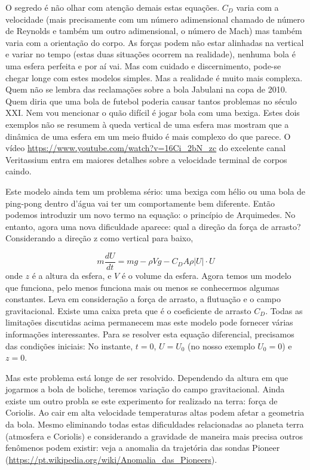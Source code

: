 O segredo é não olhar com atenção demais estas equações. $C_D$ varia com a velocidade (mais precisamente com um número adimensional chamado de número de Reynolds e também um outro adimensional, o número de Mach) mas também varia com a orientação do corpo. As forças podem não estar alinhadas na vertical e variar no tempo (estas duas situações ocorrem na realidade), nenhuma bola é uma esfera perfeita  e por aí vai. Mas com cuidado e discernimento, pode-se chegar longe com estes modelos simples. Mas a realidade é muito mais complexa. Quem não se lembra das reclamações sobre a bola Jabulani na copa de 2010. Quem diria que uma bola de futebol poderia causar tantos problemas no século XXI. Nem vou mencionar o quão difícil é jogar bola com uma bexiga. Estes dois exemplos não se resumem à queda vertical de uma esfera mas mostram que a dinâmica de uma esfera em um meio fluido é mais complexo do que parece. O vídeo \url{https://www.youtube.com/watch?v=16Ci_2bN_zc} do excelente canal Veritassium entra em maiores detalhes sobre a velocidade terminal de corpos caindo.

Este modelo ainda tem um problema sério: uma bexiga com hélio ou uma bola de ping-pong dentro d'água vai ter um comportamente bem diferente. Então podemos introduzir um novo termo na equação: o princípio de Arquimedes. No entanto, agora uma nova dificuldade aparece: qual a direção da força de arrasto? Considerando a direção z como vertical para baixo,

\[
m \frac{dU}{dt} = mg -\rho V g - C_D A \rho |U|\cdot U 
\]
onde $z$ é a altura da esfera, e $V$ é o volume da esfera. Agora temos um modelo que funciona, pelo menos funciona mais ou menos se conhecermos algumas constantes. Leva em consideração a força de arrasto, a flutuação e o campo gravitacional. Existe uma caixa preta que é o coeficiente de arrasto $C_D$. Todas as limitações discutidas acima permanecem mas este modelo pode fornecer várias informações interessantes. Para se resolver esta equação diferencial, precisamos das condições iniciais: No instante, $t=0$, $U=U_0$ (no nosso exemplo $U_0 = 0$) e $z=0$.


Mas este problema está longe de ser resolvido. Dependendo da altura em que jogarmos a bola de boliche, teremos variação do campo gravitacional. Ainda existe um outro probla se este experimento for realizado na terra: força de Coriolis. Ao cair em alta velocidade temperaturas altas podem afetar a geometria da bola. Mesmo eliminando todas estas dificuldades relacionadas ao planeta terra (atmosfera e Coriolis) e considerando a gravidade de maneira mais precisa outros fenômenos podem existir: veja a anomalia da trajetória das sondas Pioneer (\url{https://pt.wikipedia.org/wiki/Anomalia_das_Pioneers}).

